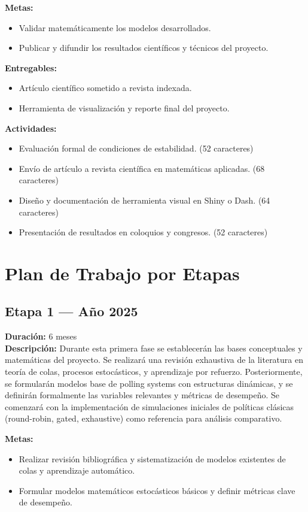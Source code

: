 \documentclass[12pt]{article}
\begin{document}
\textbf{Metas:}
\begin{itemize}
  \item Validar matemáticamente los modelos desarrollados.
  \item Publicar y difundir los resultados científicos y técnicos del proyecto.
\end{itemize}

\textbf{Entregables:}
\begin{itemize}
  \item Artículo científico sometido a revista indexada.
  \item Herramienta de visualización y reporte final del proyecto.
\end{itemize}

\textbf{Actividades:}
\begin{itemize}
  \item Evaluación formal de condiciones de estabilidad. (52 caracteres)
  \item Envío de artículo a revista científica en matemáticas aplicadas. (68 caracteres)
  \item Diseño y documentación de herramienta visual en Shiny o Dash. (64 caracteres)
  \item Presentación de resultados en coloquios y congresos. (52 caracteres)
\end{itemize}
\section*{Plan de Trabajo por Etapas}

\subsection*{Etapa 1 — Año 2025}
\textbf{Duración:} 6 meses\\
\textbf{Descripción:} Durante esta primera fase se establecerán las bases conceptuales y matemáticas del proyecto. Se realizará una revisión exhaustiva de la literatura en teoría de colas, procesos estocásticos, y aprendizaje por refuerzo. Posteriormente, se formularán modelos base de polling systems con estructuras dinámicas, y se definirán formalmente las variables relevantes y métricas de desempeño. Se comenzará con la implementación de simulaciones iniciales de políticas clásicas (round-robin, gated, exhaustive) como referencia para análisis comparativo.

\textbf{Metas:}
\begin{itemize}
  \item Realizar revisión bibliográfica y sistematización de modelos existentes de colas y aprendizaje automático.
  \item Formular modelos matemáticos estocásticos básicos y definir métricas clave de desempeño.
\end{itemize}
\end{document}
